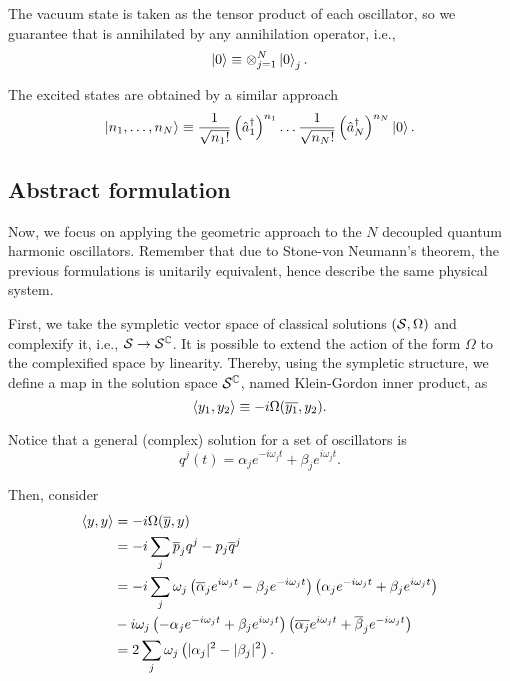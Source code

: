 The vacuum state is taken as the tensor product of each oscillator, so we guarantee that is annihilated by any annihilation operator, i.e.,
\begin{equation}
    \ket{0}\equiv\otimes_{j=1}^N\ket{0}_j.
\end{equation}

The excited states are obtained by a similar approach
\begin{equation}
    \ket{n_1,\dots,n_N}\equiv\frac{1}{\sqrt{n_1!}}\left(\hat{a}_1^{\dagger}\right)^{n_1}\dots\frac{1}{\sqrt{n_N!}}\left(\hat{a}_N^{\dagger}\right)^{n_N}\ket{0}.
\end{equation}

\subsection*{Abstract formulation}

Now, we focus on applying the geometric approach to the \(N\) decoupled quantum harmonic oscillators. Remember that due to Stone-von Neumann's theorem, the previous formulations is unitarily equivalent, hence describe the same physical system.

First, we take the sympletic vector space of classical solutions \(({\mathcal{S}},\Omega)\) and complexify it, i.e., \({\mathcal{S}}\to{\mathcal{S}}^{{\mathbb{C}}}\). It is possible to extend the action of the form \(\Omega\) to the complexified space by linearity. Thereby, using the sympletic structure, we define a map in the solution space \({\mathcal{S}}^{{\mathbb{C}}}\), named Klein-Gordon inner product, as
\begin{equation}
    \left\langle y_1, y_2\right\rangle\equiv-i\Omega(\overline{y_1},y_2).
\end{equation}

Notice that a general (complex) solution for a set of oscillators is
\begin{equation}
    q^j(t)=\alpha_je^{-i\omega_jt}+\beta_je^{i\omega_j t}.
\end{equation}

Then, consider
\begin{subequations}\label{eq:non-positive}
    \begin{align}
        \left\langle y, y\right\rangle&=-i\Omega(\overline{y},y)\\
        &=-i\sum_j\overline{p}_jq^j-p_j\overline{q}^j\\
        &=-i\sum_j\omega_j\left(\overline{\alpha}_je^{i\omega_j t}-\beta_je^{-i\omega_j t}\right)\left(\alpha_je^{-i\omega_j t}+\beta_je^{i\omega_j t}\right)\\
        &-i\omega_j\left(-\alpha_je^{-i\omega_j t}+\beta_je^{i\omega_j t}\right)\left(\overline{\alpha_j}e^{i\omega_j t}+\overline{\beta}_je^{-i\omega_j t}\right)\\
        &=2\sum_j\omega_j\left(\lvert\alpha_j\rvert^2-\lvert\beta_j\rvert^2\right).
    \end{align}
\end{subequations}

